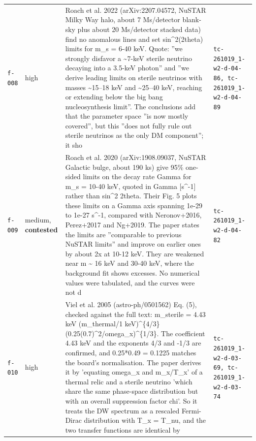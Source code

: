 \documentclass[11pt,a4paper]{article}
\begin{document}
\begin{longtable}{@{}p{}p{}p{}p{}@{}}
\texttt{f-008} & high & Roach et al. 2022 (arXiv:2207.04572, NuSTAR Milky Way halo, about 7 Ms/detector blank-sky plus about 20 Ms/detector stacked data) find no anomalous lines and set sin\textasciicircum{}2(2theta) limits for m\_s = 6-40 keV. Quote: ''we strongly disfavor a \textasciitilde{}7-keV sterile neutrino decaying into a 3.5-keV photon'' and ''we derive leading limits on sterile neutrinos with masses \textasciitilde{}15--18 keV and \textasciitilde{}25--40 keV, reaching or extending below the big bang nucleosynthesis limit''. The conclusions add that the parameter space ''is now mostly covered'', but this ''does not fully rule out sterile neutrinos as the only DM component''; it sho & \texttt{tc-261019\_\allowbreak{}1-w2-d-04-86,\allowbreak{} tc-261019\_\allowbreak{}1-w2-d-04-89} \\
\texttt{f-009} & medium, \textbf{contested} & Roach et al. 2020 (arXiv:1908.09037, NuSTAR Galactic bulge, about 190 ks) give 95\% one-sided limits on the decay rate Gamma for m\_s = 10-40 keV, quoted in Gamma [s\textasciicircum{}-1] rather than sin\textasciicircum{}2 2theta. Their Fig. 5 plots these limits on a Gamma axis spanning 1e-29 to 1e-27 s\textasciicircum{}-1, compared with Neronov+2016, Perez+2017 and Ng+2019. The paper states the limits are ''comparable to previous NuSTAR limits'' and improve on earlier ones by about 2x at 10-12 keV. They are weakened near m \textasciitilde{} 16 keV and 30-40 keV, where the background fit shows excesses. No numerical values were tabulated, and the curves were not d & \texttt{tc-261019\_\allowbreak{}1-w2-d-04-82} \\
\texttt{f-010} & high & Viel et al. 2005 (astro-ph/0501562) Eq. (5), checked against the full text: m\_sterile = 4.43 keV (m\_thermal/1 keV)\textasciicircum{}\{4/3\} (0.25(0.7)\textasciicircum{}2/omega\_x)\textasciicircum{}\{1/3\}. The coefficient 4.43 keV and the exponents 4/3 and -1/3 are confirmed, and 0.25*0.49 = 0.1225 matches the board's normalisation. The paper derives it by 'equating omega\_x and m\_x/T\_x' of a thermal relic and a sterile neutrino 'which share the same phase-space distribution but with an overall suppression factor chi'. So it treats the DW spectrum as a rescaled Fermi-Dirac distribution with T\_x = T\_nu, and the two transfer functions are identical by & \texttt{tc-261019\_\allowbreak{}1-w2-d-03-69,\allowbreak{} tc-261019\_\allowbreak{}1-w2-d-03-74} \\

\end{longtable}
\end{document}
